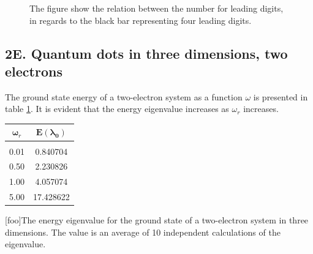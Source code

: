 \documentclass[%
reprint,
amsmath,amssymb,
aps,
]{revtex4-1}
\begin{document}
\begin{figure}[!h]
	\noindent{}
	\caption{The figure show the relation between the number for leading digits, in regards to the black bar representing four leading digits.} \label{fig:RE}
\end{figure}
 
\subsection*{2E. Quantum dots in three dimensions, two electrons} \noindent 
The ground state energy of a two-electron system as a function $\omega$ is presented in table \ref{tab2}. It is evident that the energy eigenvalue increases as $\omega_r$ increases. 

\begin{table}[!h]
	\begin{tabular} {|c|c|}
		\hline
		$\mathbf{\omega}_r$ & $\mathbf{E(\lambda_0)}$\\ 
		\hline
		& \\ 
0.01 &  0.840704 \\
0.50 &  2.230826\\
1.00 &  4.057074\\
5.00 &  17.428622\\ 
\hline 
	\end{tabular}
	[foo]{The energy eigenvalue for the ground state of a two-electron system in three dimensions. The value is an average of 10 independent calculations of the eigenvalue.\label{tab2}}
\end{table}
\end{document}
